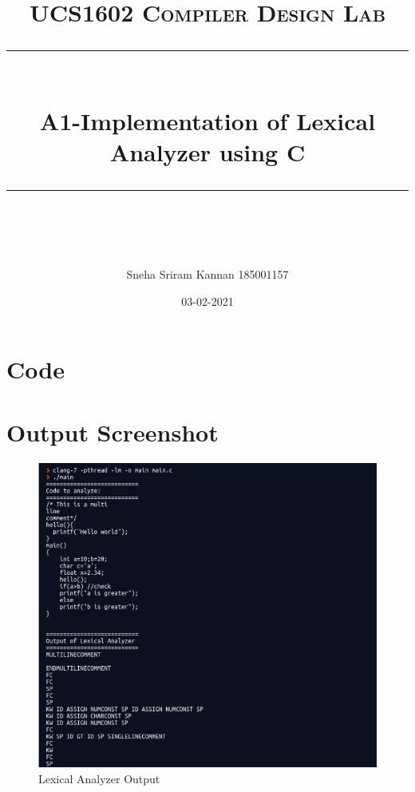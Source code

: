 \documentclass[a4paper]{article}
\title{
\normalfont \normalsize 
\textsc{UCS1602 Compiler Design Lab} \\
[10pt] 
\rule{\linewidth}{2pt} \\[10pt] 
\huge A1-Implementation of Lexical Analyzer using C  \\
\rule{\linewidth}{2pt}  \\[10pt]
}
\author{Sneha Sriram Kannan 185001157}
\date{\normalsize 03-02-2021}
\begin{document}
\maketitle

\section{Code}
\begin{scriptsize}

\end{scriptsize}
\clearpage 
\section{Output Screenshot}
\begin{figure}[htp]
    \centering
    \includegraphics[width=17cm]{LexScreenshot.png}
    \caption{Lexical Analyzer Output}
    \label{fig:galaxy}
\end{figure}
\end{document}

